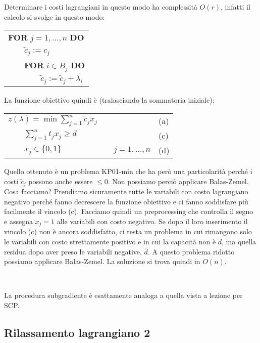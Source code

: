 \documentclass[11pt]{book}
\begin{document}
Determinare i costi lagrangiani in questo modo ha complessit\`a
$O(r)$, infatti il calcolo si svolge in questo modo: 

\vspace{20pt}
\begin{tabular}{l}
\textbf{FOR} $j=1,\dots,n$ \textbf{DO}\\
$\qquad \tilde{c}_j := c_j$\\
$\qquad$\textbf{FOR} $i \in B_j$ \textbf{DO}\\
$\qquad\qquad \tilde{c}_j := \tilde{c}_j + \lambda_i$
\end{tabular}
\vspace{20pt}

La funzione obiettivo quindi \`e (tralasciando la sommatoria
iniziale):

\begin{center}
\begin{tabular}{lp{2cm}ll}
$z(\lambda) = \min \sum\limits_{j=1}^n \tilde{c}_jx_j$ & & & (a)\\
$\qquad \sum\limits_{j=1}^n t_jx_j \geq d$ & & & (c)\\
$\qquad x_j \in\{0,1\}$ & & $j = 1,\dots,n$ & (d) \\
\end{tabular}
\end{center}

Quello ottenuto \`e un problema KP01-min che ha per\`o una
particolarit\`a perch\'e i costi $\tilde{c}_j$ possono anche essere
$\leq 0$. Non possiamo perci\`o applicare Balas-Zemel. Cosa facciamo?
Prendiamo sicuramente tutte le variabili con costo lagrangiano
negativo perch\'e fanno decrescere la funzione obiettivo e ci fanno
soddisfare pi\`u facilmente il vincolo (c). Facciamo quindi un
preprocessing che controlla il segno e assegna $x_j=1$ alle variabili
con costo negativo. Se dopo il loro inserimento il vincolo (c) non \`e
ancora soddisfatto, ci resta un problema in cui rimangono solo le
variabili con costo strettamente positivo e in cui la capacit\`a non
\`e $d$, ma quella residua dopo aver preso le variabili negative,
$\bar{d}$. A questo problema ridotto possiamo applicare
Balas-Zemel. La soluzione si trova quindi in $O(n)$.

\

La procedura subgradiente \`e esattamente analoga a quella vista a
lezione per SCP.

\subsection*{Rilassamento lagrangiano 2}
\end{document}
